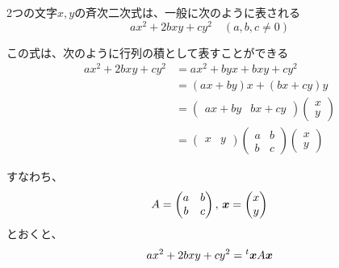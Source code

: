 \documentclass[../../../topic_linear-algebra]{subfiles}
\begin{document}
2つの文字$x,y$の斉次二次式は、一般に次のように表される
\begin{equation*}
  ax^2 + 2bxy + cy^2 \quad (a,b,c \neq 0)
\end{equation*}

この式は、次のように行列の積として表すことができる
\begin{align*}
  ax^2 + 2bxy + cy^2 & = ax^2 + byx + bxy + cy^2                    \\
                     & = (ax + by)x + (bx + cy)y                    \\
                     & = \begin{pmatrix}
                           ax + by & bx + cy
                         \end{pmatrix} \begin{pmatrix}
                                         x \\
                                         y
                                       \end{pmatrix}               \\
                     & = \begin{pmatrix}
                           x & y
                         \end{pmatrix} \begin{pmatrix}
                                         a & b \\
                                         b & c
                                       \end{pmatrix} \begin{pmatrix}
                                                       x \\
                                                       y
                                                     \end{pmatrix}
\end{align*}

すなわち、
\begin{equation*}
  A = \begin{pmatrix}
    a & b \\
    b & c
  \end{pmatrix},\, \vb*{x} = \begin{pmatrix}
    x \\
    y
  \end{pmatrix}
\end{equation*}
とおくと、
\begin{equation*}
  ax^2 + 2bxy + cy^2 = {}^t\vb*{x} A \vb*{x}
\end{equation*}
\end{document}

